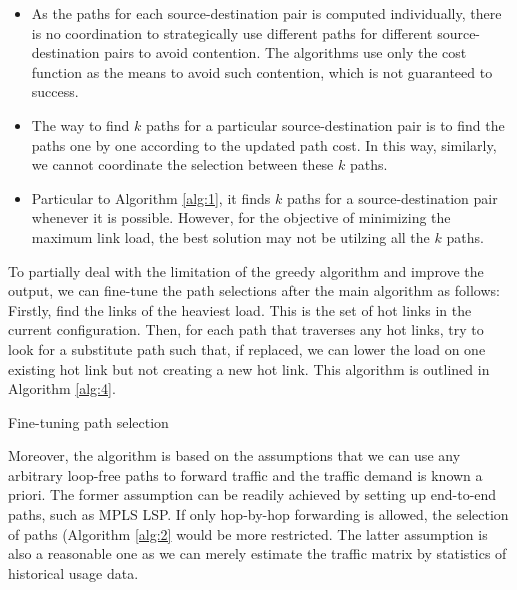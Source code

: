 \documentclass[conference]{IEEEtran}
\begin{document}
\begin{itemize}
\item As the paths for each source-destination pair is computed
	individually, there is no coordination to strategically use different
	paths for different source-destination pairs to avoid contention. The
	algorithms use only the cost function as the means to avoid such
	contention, which is not guaranteed to success.
\item The way to find $k$ paths for a particular source-destination pair is to
	find the paths one by one according to the updated path cost. In this
	way, similarly, we cannot coordinate the selection between these $k$
	paths.
\item Particular to Algorithm \ref{alg:1}, it finds $k$ paths for a
	source-destination pair whenever it is possible. However, for the
	objective of minimizing the maximum link load, the best solution may
	not be utilzing all the $k$ paths.
\end{itemize}

To partially deal with the limitation of the greedy algorithm and improve the
output, we can fine-tune the path selections after the main algorithm as
follows: Firstly, find the links of the heaviest load. This is the set of hot
links in the current configuration. Then, for each path that traverses any hot
links, try to look for a substitute path such that, if replaced, we can lower
the load on one existing hot link but not creating a new hot link. This
algorithm is outlined in Algorithm \ref{alg:4}.

\begin{algorithm}
\caption{Fine-tuning path selection}\label{alg:4}
\end{algorithm}

Moreover, the algorithm is based on the assumptions that we can use any
arbitrary loop-free paths to forward traffic and the traffic demand is known a
priori. The former assumption can be readily achieved by setting up end-to-end
paths, such as MPLS LSP. If only hop-by-hop forwarding is allowed, the
selection of paths (Algorithm \ref{alg:2} would be more restricted. The latter
assumption is also a reasonable one as we can merely estimate the traffic
matrix by statistics of historical usage data.
\end{document}
